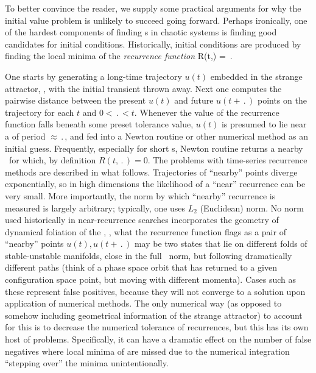 To better convince the reader, we supply some practical
arguments for why the initial value problem is unlikely to
succeed going forward. Perhaps ironically, one of the hardest
components of finding {\po}s in chaotic systems is finding
good candidates for initial conditions.
Historically, initial conditions
are produced by finding the local minima of the \emph{recurrence
function}
\beq
R(t,\period{}) = 
\,.

One starts by generating a long-time trajectory $u(t)$ embedded in the
strange attractor, \ie, with the initial transient thrown away. Next one
computes the pairwise distance
between the present $u(t)$ and future $u(t+\period{})$ points
on the trajectory for each $t$ and $0<\period{}<t$. Whenever the value of the
recurrence function falls beneath some preset tolerance value, $u(t)$ is
presumed to lie near a {\po} of period $\approx \period{}$, and fed into a
Newton routine or other numerical method
as an initial guess. Frequently, especially for short \po s,
Newton routine returns a nearby \po\ for which, by definition
$R(t,\period{})=0$.
The problems with time-series recurrence methods are described
in what follows.
Trajectories of ``nearby'' points diverge exponentially, so
in high dimensions the likelihood of a ``near'' recurrence can be very
small.
More importantly, the norm by which ``nearby'' recurrence
 is measured is largely arbitrary; typically, one uses
$L_2$ (Euclidean) norm. No norm used historically in near-recurrence
searches incorporates the geometry of dynamical foliation of the
\statesp, \ie, what the recurrence function flags as a pair of ``nearby''
points $u(t),u(t+\period{})$ may be two states that lie on different folds of
stable-unstable manifolds, close in the full \statesp\ norm, but following
dramatically different paths (think of a phase space orbit that has
returned to a given configuration space point, but moving with
different momenta).
Cases such as these represent false
positives, because they will not converge to a solution
upon application of numerical methods. The only
numerical way (as opposed to somehow including geometrical information
of the strange attractor)
to account for this is to
decrease the numerical tolerance of
recurrences, but this has its own host of problems.
Specifically, it can have a dramatic effect on the
number of false negatives where local
minima of  are missed due to the
numerical integration ``stepping over''
the minima unintentionally.
